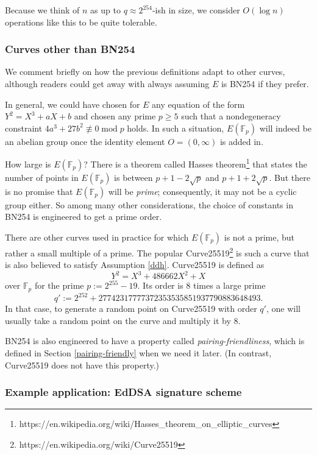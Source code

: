 Because we think of \(n\) as up to \(q \approx 2^{254}\)-ish in size, we
consider \(O( \log n )\) operations like this to be quite
tolerable.

\subsubsection{Curves other than BN254}

We comment briefly on how the previous definitions adapt to other
curves, although readers could get away with always assuming \(E\) is
BN254 if they prefer.

In general, we could have chosen for \(E\) any equation of the form
\(Y^{2} = X^{3} + aX + b\) and chosen any prime \(p \geq 5\) such that a
nondegeneracy constraint \(4a^{3} + 27b^{2} \not \equiv 0\operatorname{mod}p\)
holds. In such a situation, \(E( {\mathbb{F}}_{p} )\) will
indeed be an abelian group once the identity element \(O = (0,\infty)\)
is added in.

How large is \(E( {\mathbb{F}}_{p} )\)? There is a theorem
called Hasse\textquotesingle s theorem\footnote{https://en.wikipedia.org/wiki/Hasse\textquotesingle s\_theorem\_on\_elliptic\_curves}
that states the number of points in \(E( {\mathbb{F}}_{p} )\)
is between \(p + 1 - 2\sqrt{p}\) and \(p + 1 + 2\sqrt{p}\). But there is
no promise that \(E( {\mathbb{F}}_{p} )\) will be
\emph{prime}; consequently, it may not be a cyclic group either. So
among many other considerations, the choice of constants in BN254 is
engineered to get a prime order.

There are other curves used in practice for which
\(E( {\mathbb{F}}_{p} )\) is not a prime, but rather a small
multiple of a prime. The popular Curve25519\footnote{https://en.wikipedia.org/wiki/Curve25519}
is such a curve that is also believed to satisfy
Assumption \ref{ddh}. Curve25519 is defined as
\[Y^{2} = X^{3} + 486662X^{2} + X\] over \({\mathbb{F}}_{p}\) for the
prime \(p := 2^{255} - 19\). Its order is \(8\) times a large prime
\[q' := 2^{252} + 27742317777372353535851937790883648493.\] In that case,
to generate a random point on Curve25519 with order \(q'\), one will
usually take a random point on the curve and multiply it by \(8\).

BN254 is also engineered to have a property called
\emph{pairing-friendliness}, which is defined in Section \ref{pairing-friendly} when
we need it later. (In contrast, Curve25519 does not have this property.)

\subsubsection{Example application: EdDSA signature scheme}\label{eddsa}

